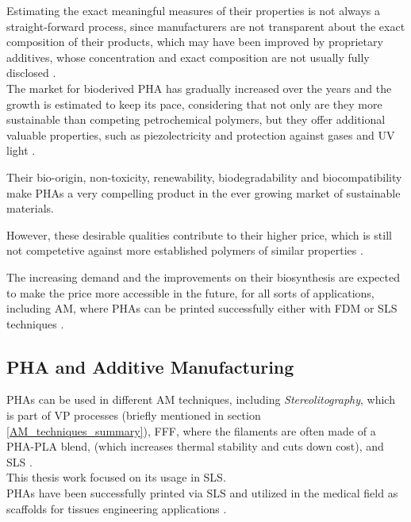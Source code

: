 \documentclass{article}
\begin{document}
    Estimating the exact meaningful measures of their properties is not always a straight-forward process, 
    since manufacturers are not transparent about the exact composition of their products, which may have been 
    improved by proprietary additives, whose concentration and exact composition are not usually fully disclosed \autocite{Kovalcik_PHA_Review}. \\ 
    
    The market for bioderived PHA has gradually increased over the years and the growth is estimated to keep its pace, considering that not only are they more sustainable
    than competing petrochemical polymers, but they offer additional valuable properties, such as piezolectricity 
    and protection against gases and UV light \autocite{Kovalcik_PHA_Review}.

    Their bio-origin, non-toxicity, renewability, biodegradability and biocompatibility make PHAs a very compelling product in the 
    ever growing market of sustainable materials. 

    However, these desirable qualities contribute to their higher price, which is still not competetive against more established 
    polymers of similar properties \autocite{Kovalcik_PHA_Review}. 

    The increasing demand and the improvements on their biosynthesis are expected to make the price more accessible in the future, for all sorts of 
    applications, including AM, where PHAs can be printed successfully either with FDM or SLS techniques \autocites{Kovalcik_PHA_Review}. 
    
    \clearpage

    
    \subsection{PHA and Additive Manufacturing \label{PHA_in_Additive}}

    PHAs can be used in different AM techniques, including \textit{Stereolitography}, which is part of VP processes (briefly mentioned in section 
    \ref{AM_techniques_summary}), 
    FFF, where the filaments are often made of a PHA-PLA blend, (which increases thermal stability and cuts down cost), 
    and SLS \autocite{Kovalcik_PHA_Review}. \\ 

    This thesis work focused on its usage in SLS. \\ 

    PHAs have been successfully printed via SLS and utilized in the medical field as scaffolds for tissues engineering applications \autocites{Messori_Bondioli_PHAs}. 
\end{document}
